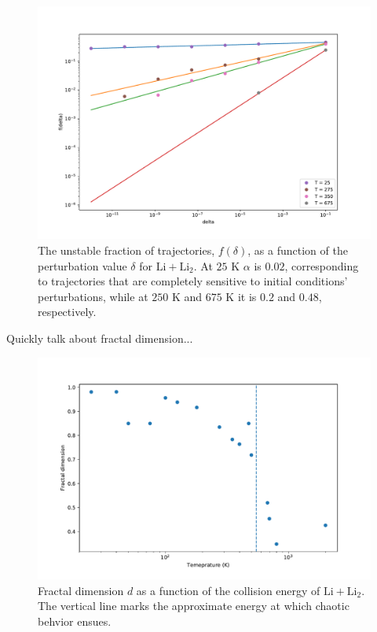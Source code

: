 \documentclass[%
 reprint,
 amsmath,amssymb,
 aps,
10pt
]{revtex4-1}
\begin{document}
\begin{figure}[ht]
\begin{center}
\includegraphics[width=1.05\linewidth]{uncertainty.pdf}
\caption{The unstable fraction of trajectories, $f(\delta)$, as a function of the perturbation value $\delta$ for $\mathrm{Li} + \mathrm{Li_2}$. At $25$ K $\alpha$ is $0.02$, corresponding to trajectories that are completely sensitive to initial conditions' perturbations, while at $250$ K and $675$ K it is $0.2$ and $0.48$, respectively.}
\label{fig:unc}
\end{center}
\end{figure}

Quickly talk about fractal dimension...

\begin{figure}[ht]
\begin{center}
\includegraphics[width=1.05\linewidth]{fractal_dim.pdf}
\caption{Fractal dimension $d$ as a function of the collision energy of $\mathrm{Li} + \mathrm{Li_2}$. The vertical line marks the approximate energy at which chaotic behvior ensues.}
\label{fig:frac_dim}
\end{center}
\end{figure}
\end{document}
